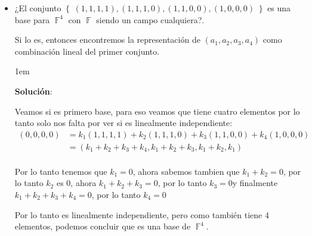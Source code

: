 \documentclass[12pt, fleqn]{report}                             %
\newenvironment{SmallIndentation}[1][0.75em]                    %
        {\begin{adjustwidth}{#1}{}\begin{footnotesize}}             %
        {\end{footnotesize}\end{adjustwidth}}                       %
\theoremstyle{break}                                            %
\DeclareMathOperator \GenericField {\mathbb{F}}                 %
\newcommand{\Set}[1]            {\left\{ \; #1 \; \right\}}     %
\begin{document}
                \begin{itemize}
                    
                    \item 
                        ¿El conjunto $\Set{(1, 1, 1, 1), (1, 1, 1, 0), (1, 1, 0, 0), (1, 0, 0, 0)}$ es una base
                        para $\GenericField^4$ con $\GenericField$ siendo un campo cualquiera?.

                        Si lo es, entonces encontremos la representación de $(a_1, a_2, a_3, a_4)$ como combinación
                        lineal del primer conjunto.

                        \begin{SmallIndentation}[1em]
                            \textbf{Solución}:

                            Veamos si es primero base, para eso veamos que tiene cuatro elementos por lo tanto
                            solo nos falta por ver si es linealmente independiente:
                            \begin{align*}
                                (0, 0, 0, 0)
                                    &= k_1(1, 1, 1, 1) + k_2(1, 1, 1, 0) + k_3(1, 1, 0, 0) + k_4(1, 0, 0, 0)    \\
                                    &= (k_1+k_2+k_3+k_4, k_1+k_2+k_3, k_1+k_2, k_1)                             \\
                            \end{align*}

                            Por lo tanto tenemos que $k_1 = 0$, ahora sabemos tambien que $k_1+k_2 = 0$, por lo tanto $k_2$
                            es $0$, ahora $k_1+k_2+k_3 = 0$, por lo tanto $k_3=0 $y finalmente $k_1+k_2+k_3+k_4 = 0$, por
                            lo tanto $k_4 = 0$

                            Por lo tanto es linealmente independiente, pero como también tiene 4 elementos, podemos concluir que 
                            es una base de $\GenericField^4$.


\end{SmallIndentation}
\end{itemize}
\end{document}
